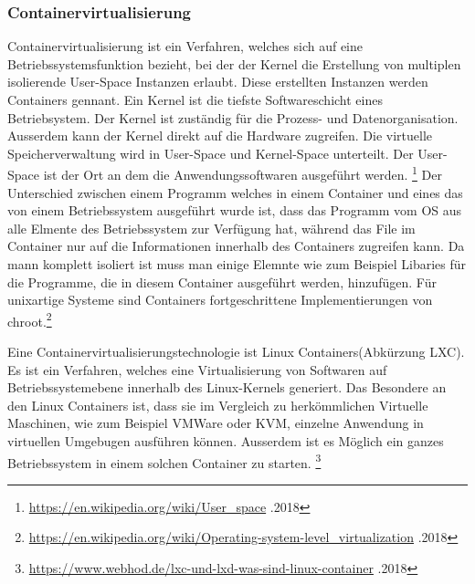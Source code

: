 \documentclass[10pt]{article}
\begin{document}
\pagebreak	
	
	\subsubsection{Containervirtualisierung}
	Containervirtualisierung ist ein Verfahren, welches sich auf eine Betriebssystemsfunktion bezieht, bei der der Kernel die Erstellung von multiplen isolierende User-Space Instanzen erlaubt. Diese erstellten Instanzen werden Containers gennant.\cite{10} Ein Kernel ist die tiefste Softwareschicht eines Betriebsystem. Der Kernel ist zuständig für die Prozess- und Datenorganisation. Ausserdem kann der Kernel direkt auf die Hardware zugreifen.\cite{11} Die virtuelle Speicherverwaltung wird in User-Space und Kernel-Space unterteilt. Der User-Space ist der Ort an dem die  Anwendungssoftwaren ausgeführt werden. \footnote{\label{foot:6} \href{https://en.wikipedia.org/wiki/User_space}{https://en.wikipedia.org/wiki/User_space} .2018} 
Der Unterschied zwischen einem Programm welches in einem Container und eines das von einem Betriebssystem ausgeführt wurde ist, dass das Programm vom OS aus alle Elmente des Betriebssystem zur Verfügung hat, während das File im Container nur auf die Informationen innerhalb des Containers zugreifen kann. Da mann komplett isoliert ist muss man einige Elemnte wie zum Beispiel Libaries für die Programme, die in diesem Container ausgeführt werden, hinzufügen. 
Für unixartige Systeme sind Containers fortgeschrittene Implementierungen von chroot.\footnote{\label{foot:4} \href{https://en.wikipedia.org/wiki/Operating-system-level_virtualization}{https://en.wikipedia.org/wiki/Operating-system-level_virtualization} .2018} 
	
	Eine Containervirtualisierungstechnologie ist Linux Containers(Abkürzung LXC). Es ist ein Verfahren, welches eine Virtualisierung von Softwaren auf Betriebssystemebene innerhalb des Linux-Kernels generiert. 
Das Besondere an den Linux Containers ist, dass sie im Vergleich zu herkömmlichen Virtuelle Maschinen, wie zum Beispiel VMWare oder KVM, einzelne Anwendung in virtuellen Umgebugen ausführen können. Ausserdem ist es Möglich ein ganzes Betriebssystem in einem solchen Container zu starten.  \footnote{\label{foot:5} \href{https://www.webhod.de/lxc-und-lxd-was-sind-linux-container}{https://www.webhod.de/lxc-und-lxd-was-sind-linux-container} .2018}  
\end{document}
